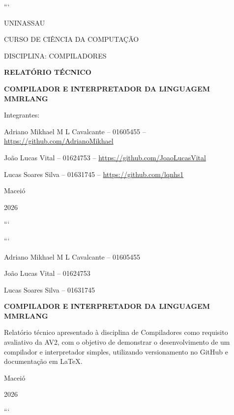\documentclass[12pt,a4paper]{article}
\begin{document}
\begin{titlepage}
\centering

```
{\large UNINASSAU\par}
\vspace{0.5cm}
{\large CURSO DE CIÊNCIA DA COMPUTAÇÃO\par}
\vspace{0.5cm}
{\large DISCIPLINA: COMPILADORES\par}

\vfill

{\bfseries\Large RELATÓRIO TÉCNICO\par}
\vspace{0.5cm}
{\bfseries\Large COMPILADOR E INTERPRETADOR DA LINGUAGEM MMRLANG\par}

\vfill

{\large Integrantes:\par}
\vspace{0.3cm}

{\small Adriano Mikhael M L Cavalcante -- 01605455 -- \url{https://github.com/AdrianoMikhael}\par}
{\small João Lucas Vital -- 01624753 -- \url{https://github.com/JoaoLucasVital}\par}
{\small Lucas Soares Silva -- 01631745 -- \url{https://github.com/lqnhs1}\par}

\vfill

{\large Maceió\par}
{\large 2026\par}
```

\end{titlepage}

\begin{titlepage}
\centering

```
{\large Adriano Mikhael M L Cavalcante -- 01605455\par}
{\large João Lucas Vital -- 01624753\par}
{\large Lucas Soares Silva -- 01631745\par}

\vfill

{\bfseries\Large COMPILADOR E INTERPRETADOR DA LINGUAGEM MMRLANG\par}

\vspace{3cm}

\begin{flushright}
\begin{minipage}{8cm}
Relatório técnico apresentado à disciplina de Compiladores como requisito avaliativo da AV2, com o objetivo de demonstrar o desenvolvimento de um compilador e interpretador simples, utilizando versionamento no GitHub e documentação em LaTeX.
\end{minipage}
\end{flushright}

\vfill

{\large Maceió\par}
{\large 2026\par}
```

\end{titlepage}
\end{document}
